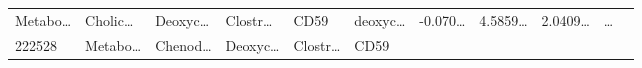 \documentclass[
]{article}
\begin{document}
\begin{longtable}[]{@{}lllllllllll@{}}
\begin{minipage}[t]{0.07\columnwidth}
Metabo\ldots{}\strut
\end{minipage} & \begin{minipage}[t]{0.07\columnwidth}\raggedright
Cholic\ldots{}\strut
\end{minipage} & \begin{minipage}[t]{0.09\columnwidth}\raggedright
Deoxyc\ldots{}\strut
\end{minipage} & \begin{minipage}[t]{0.07\columnwidth}\raggedright
Clostr\ldots{}\strut
\end{minipage} & \begin{minipage}[t]{0.07\columnwidth}\raggedright
CD59\strut
\end{minipage} & \begin{minipage}[t]{0.09\columnwidth}\raggedright
deoxyc\ldots{}\strut
\end{minipage} & \begin{minipage}[t]{0.07\columnwidth}\raggedright
-0.070\ldots{}\strut
\end{minipage} & \begin{minipage}[t]{0.07\columnwidth}\raggedright
4.5859\ldots{}\strut
\end{minipage} & \begin{minipage}[t]{0.07\columnwidth}\raggedright
2.0409\ldots{}\strut
\end{minipage} & \begin{minipage}[t]{0.03\columnwidth}\raggedright
\ldots{}\strut
\end{minipage}\tabularnewline
\begin{minipage}[t]{0.05\columnwidth}\raggedright
222528\strut
\end{minipage} & \begin{minipage}[t]{0.07\columnwidth}\raggedright
Metabo\ldots{}\strut
\end{minipage} & \begin{minipage}[t]{0.07\columnwidth}\raggedright
Chenod\ldots{}\strut
\end{minipage} & \begin{minipage}[t]{0.09\columnwidth}\raggedright
Deoxyc\ldots{}\strut
\end{minipage} & \begin{minipage}[t]{0.07\columnwidth}\raggedright
Clostr\ldots{}\strut
\end{minipage} & \begin{minipage}[t]{0.07\columnwidth}\raggedright
CD59\strut
\end{minipage} & \begin{minipage}[t]{0.09\columnwidth}\raggedright

\end{minipage}
\end{longtable}
\end{document}
